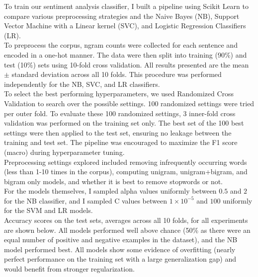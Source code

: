 \documentclass{amsart}
\theoremstyle{definition}
\theoremstyle{remark}
\numberwithin{equation}{section}
\begin{document}
To train our sentiment analysis classifier, I built a pipeline using Scikit
Learn to compare various preprocessing strategies and the Naive Bayes (NB),
Support Vector Machine with a Linear kernel (SVC), and Logistic Regression
Classifiers (LR). \\

To preprocess the corpus, ngram counts were collected for each sentence and
encoded in a one-hot manner. The data were then split into training (90\%) and
test (10\%) sets using 10-fold cross validation. All results presented are the
mean $\pm$ standard deviation across all 10 folds. This procedure was performed
independently for the NB, SVC, and LR classifiers. \\

To select the best performing hyperparameters, we used Randomized Cross
Validation to search over the possible settings. 100 randomized settings were
tried per outer fold. To evaluate these 100 randomized settings, 3 inner-fold
cross validation was performed on the training set only. The best set of the 100
best settings were then applied to the test set, ensuring no leakage between
the training and test set. The pipeline was encouraged to maximize the F1
score (macro) during hyperparameter tuning. \\

Preprocessing settings explored included removing infrequently occurring words
(less than 1-10 times in the corpus), computing unigram, unigram+bigram, and
bigram only models, and whether it is best to remove stopwords or not. \\

For the models themselves, I sampled alpha values uniformly between $0.5$ and $2$
for the NB classifier, and I sampled C values between $1\times10^{-5}$ and $100$
uniformly for the SVM and LR models. \\

Accuracy scores on the test sets, averages across all 10 folds, for all
experiments are shown below. All models performed well above chance (50\% as
there were an equal number of positive and negative examples in the dataset),
and the NB model performed best. All models show some evidence of overfitting
(nearly perfect performance on the training set with a large generalization gap)
and would benefit from stronger regularization. \\
\end{document}
